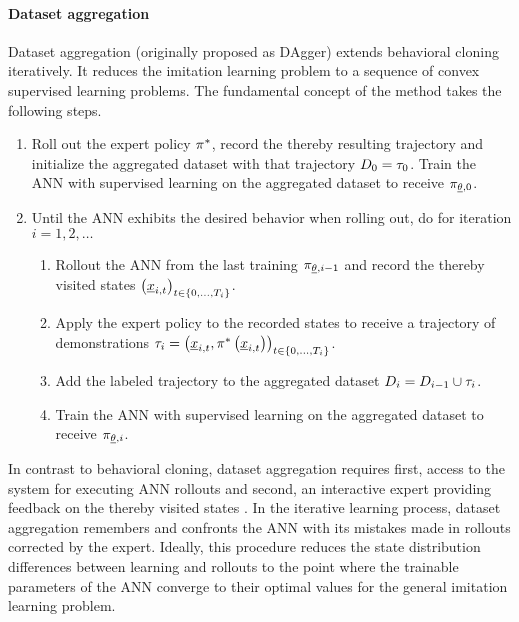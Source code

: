 \paragraph*{Dataset aggregation}$\ $\\
Dataset aggregation (originally proposed as DAgger\cite{Ross2010}) 
extends behavioral cloning iteratively.
It reduces the imitation learning problem 
to a sequence of convex supervised learning problems.
The fundamental concept of the method takes the following steps.
\begin{enumerate}
    \item 
    Roll out the expert policy $\pi^*$,
    record the thereby resulting trajectory
    and initialize the aggregated dataset with that trajectory
    $D_0 = \tau_0$.
    Train the ANN with supervised learning on the aggregated dataset
    to receive
    $\pi_{\underline{\theta}, 0}$.
    \item Until the ANN exhibits the desired behavior when rolling out, 
    do for iteration $i = 1,2,\dots$
    \begin{enumerate}
        \item Rollout the ANN from the last training
        $\pi_{\underline{\theta}, i-1}$
        and record the thereby visited states
        $\left({\underline{x}_{i,t}}\right)_{t\in \left\{{0, \dots, T_i}\right\}}$.
        \item Apply the expert policy to the recorded states 
        to receive a trajectory of demonstrations
        $\tau_i = \left({\underline{x}_{i,t}, 
    \pi^*\left({\underline{x}_{i,t}}\right)}\right)
    _{t \in \left\{{0, \dots, T_i}\right\}}$.
        \item Add the labeled trajectory to the aggregated dataset
        $D_i = D_{i-1} \cup \tau_i$.
        \item Train the ANN with supervised learning on the aggregated dataset
        to receive
        $\pi_{\underline{\theta}, i}$.
    \end{enumerate}
\end{enumerate}
In contrast to behavioral cloning,
dataset aggregation requires first, 
access to the system for executing ANN rollouts
and second, 
an interactive expert providing feedback 
on the thereby visited states \cite{yue2018imitation}.
In the iterative learning process,
dataset aggregation
remembers and confronts the ANN with
its mistakes made in rollouts corrected by the expert.
Ideally, this procedure reduces the 
state distribution differences between learning and rollouts
to the point where
the trainable parameters of the ANN converge to their
optimal values for the general imitation learning problem.





